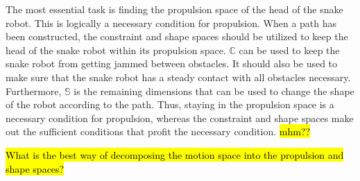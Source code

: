 The most essential task is finding the propulsion space of the head of the snake robot. This is logically a necessary condition for propulsion. When a path has been constructed, the constraint and shape spaces should be utilized to keep the head of the snake robot within its propulsion space. $\mathbb{C}$ can be used to keep the snake robot from getting jammed between obstacles. It should also be used to make sure that the snake robot has a steady contact with all obstacles necessary. Furthermore, $\mathbb{S}$ is the remaining dimensions that can be used to change the shape of the robot according to the path. Thus, staying in the propulsion space is a necessary condition for propulsion, whereas the constraint and shape spaces make out the sufficient conditions that profit the necessary condition. \hl{mhm??}

\hl{What is the best way of decomposing the motion space into the propulsion and shape spaces?}